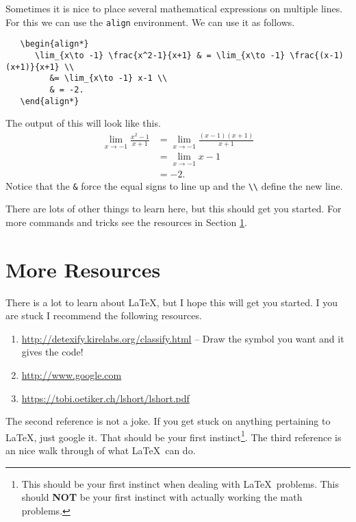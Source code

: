 \documentclass{amsart}
\begin{document}
   Sometimes it is nice to place several mathematical expressions on multiple lines. For this we can use the \verb|align| environment. We can use it as follows.
   \begin{verbatim}
   \begin{align*}
      \lim_{x\to -1} \frac{x^2-1}{x+1} & = \lim_{x\to -1} \frac{(x-1)(x+1)}{x+1} \\
         &= \lim_{x\to -1} x-1 \\
         & = -2.
   \end{align*}
   \end{verbatim}
   The output of this will look like this.
   \begin{align*}
      \lim_{x\to -1} \frac{x^2-1}{x+1} & = \lim_{x\to -1} \frac{(x-1)(x+1)}{x+1} \\
         &= \lim_{x\to -1} x-1 \\
         & = -2.
   \end{align*}
   Notice that the \verb|&| force the equal signs to line up and the \verb|\\| define the new line. 



   There are lots of other things to learn here, but this should get you started. For more commands and tricks see the resources in Section \ref{more}.

  

\section{More Resources} \label{more}


   There is a lot to learn about \LaTeX, but I hope this will get you started. I you are stuck I recommend the following resources.
   \begin{enumerate}
      \item \url{http://detexify.kirelabs.org/classify.html} -- Draw the symbol you want and it gives the code!
      \item \url{http://www.google.com}
      \item \url{https://tobi.oetiker.ch/lshort/lshort.pdf}
   \end{enumerate}
   The second reference is not a joke. If you get stuck on anything pertaining to \LaTeX, just google it. That should be your first instinct\footnote{This should be your first instinct when dealing with \LaTeX\ problems. This should {\bf NOT} be your first instinct with actually working the math problems.}. The third reference is an nice walk through of what \LaTeX\ can do. 
\end{document}
